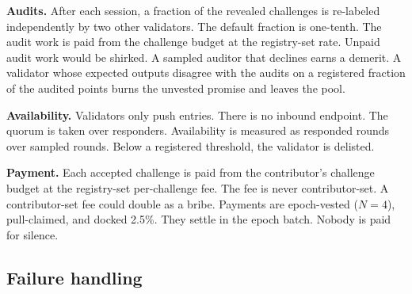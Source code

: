 \documentclass[11pt]{article}
\begin{document}
\textbf{Audits.} After each session, a fraction of the revealed
challenges is re-labeled independently by two other validators.
The default fraction is one-tenth. The audit work is paid from
the challenge budget at the registry-set rate. Unpaid audit work
would be shirked. A sampled auditor that declines earns a demerit.
A validator whose expected outputs disagree with the audits on a
registered fraction of the audited points burns the unvested
promise and leaves the pool.

\textbf{Availability.} Validators only push entries. There is no
inbound endpoint. The quorum is taken over responders.
Availability is measured as responded rounds over sampled rounds.
Below a registered threshold, the validator is delisted.

\textbf{Payment.} Each accepted challenge is paid from the
contributor's challenge budget at the registry-set per-challenge
fee. The fee is never contributor-set. A contributor-set fee could
double as a bribe. Payments are epoch-vested ($N=4$), pull-claimed,
and docked 2.5\%. They settle in the epoch batch. Nobody is paid
for silence.

\subsection{Failure handling}
\end{document}
